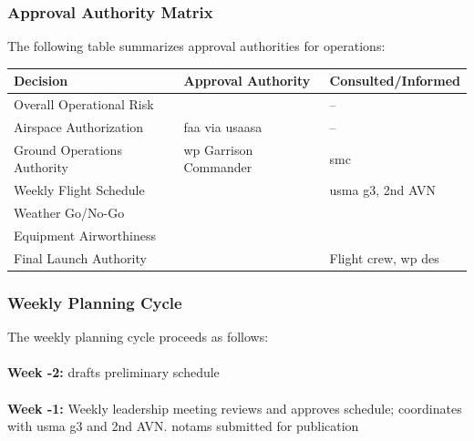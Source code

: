     \subsubsection{Approval Authority Matrix}\label{ssec:approvalmatrix} The following table summarizes approval authorities for \projectmars{} operations:
        \begin{center}
        \begin{tabular}{|l|l|l|}
        \hline
        \textbf{Decision} & \textbf{Approval Authority} & \textbf{Consulted/Informed} \\
        \hline
        Overall Operational Risk & \nameref{role:hospitalcommander} & -- \\
        \hline
        Airspace Authorization & \ac{faa} via \ac{usaasa} & -- \\
        \hline
        Ground Operations Authority & \ac{wp} Garrison Commander & \ac{smc} \\
        \hline
        Weekly Flight Schedule & \nameref{role:projectoic} & \ac{usma} \ac{g3}, 2nd AVN \\
        \hline
        Weather Go/No-Go & \nameref{role:projectoic} & \nameref{role:projectncoic} \\
        \hline
        Equipment Airworthiness & \nameref{role:rpic} & \nameref{role:technicallead} \\
        \hline
        Final Launch Authority & \nameref{role:rpic} & Flight crew, \ac{wp} \ac{des} \\
        \hline
        \end{tabular}
        \end{center}

    \subsubsection{Weekly Planning Cycle}\label{ssec:weeklyplanning} The weekly planning cycle proceeds as follows:

        \paragraph{} \textbf{Week -2:}  drafts preliminary schedule
        \paragraph{} \textbf{Week -1:} Weekly leadership meeting reviews and approves schedule;  coordinates with \ac{usma} \ac{g3} and 2nd AVN. \ac{notam}s submitted for publication
